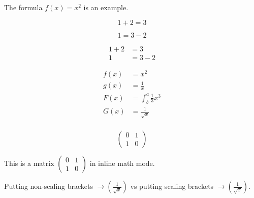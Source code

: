 \documentclass{article}
\begin{document}
The formula $f(x) = x^2$ is an example.


\begin{equation*}
    1 + 2 = 3
\end{equation*}

\begin{equation*}
    1 = 3 - 2
\end{equation*}


\begin{align*}
    1 + 2 &= 3\\ %
    1 &= 3 - 2   %
\end{align*}

\begin{align*}
    f(x) &= x^2\\
    g(x) &= \frac{1}{x}\\
    F(x) &= \int^a_b \frac{1}{3}x^3\\
    G(x) &= \frac{1}{\sqrt{x}}\\
\end{align*}

$$
\begin{pmatrix}
    0 & 1\\
    1 & 0
\end{pmatrix}
$$

This is a matrix $
\begin{pmatrix}
    0 & 1\\
    1 & 0
\end{pmatrix}
$ in inline math mode.

Putting non-scaling brackets $\rightarrow (\frac{1}{\sqrt{x}})$ vs
putting scaling brackets $\rightarrow \left(\frac{1}{\sqrt{x}}\right)$.
\end{document}
